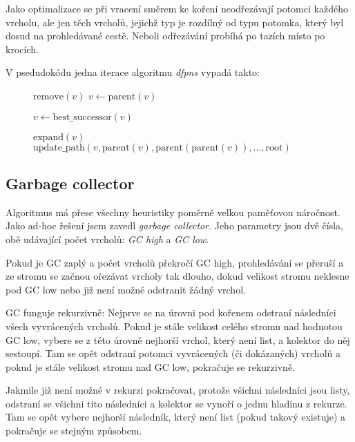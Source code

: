 \documentclass{article}
\begin{document}
Jako optimalizace se při vracení směrem ke kořeni neodřezávají potomci každého
vrcholu, ale jen těch vrcholů, jejichž typ je rozdílný od typu potomka, který
byl dosud na prohledávané cestě. Neboli odřezávání probíhá po tazích místo po
krocích.

V psedudokódu jedna iterace algoritmu \emph{dfpns} vypadá takto:
\begin{figure}[H]
\begin{algorithmic}
    \STATE {}
      \STATE \(\text{remove}(v)\)
    \ENDIF
    \STATE \(v \gets \text{parent}(v)\)
  \ENDWHILE
  
    \STATE \(v \gets \text{best\_successor}(v)\)
  \ENDWHILE
  
  \STATE \(\text{expand}(v)\)
  \STATE \(\text{update\_path}(v, \text{parent}(v), 
                               \text{parent}(\text{parent}(v)),
                               \ldots,
                               \text{root})\)
\end{algorithmic}
\end{figure}

\subsection{Garbage collector}
Algoritmus má přese všechny heuristiky poměrně velkou paměťovou náročnost. Jako
ad-hoc řešení jsem zavedl \emph{garbage collector}. Jeho parametry jsou dvě
čísla, obě udávající počet vrcholů: \emph{GC high} a \emph{GC low}.

Pokud je GC zaplý a počet vrcholů překročí GC high, prohledávání se
přeruší a ze stromu se začnou ořezávat vrcholy tak dlouho, dokud velikost
stromu neklesne pod GC low nebo již není možné odstranit žádný vrchol.

GC funguje rekurzivně: Nejprve se na úrovni pod kořenem odstraní následníci 
všech vyvrácených vrcholů. Pokud je stále velikost celého stromu nad hodnotou 
GC low, vybere se z této úrovně nejhorší vrchol, který není list, a kolektor do 
něj sestoupí. Tam se opět odstraní potomci vyvrácených (či dokázaných) vrcholů 
a pokud je stále velikost stromu nad GC low, pokračuje se rekurzivně.

Jakmile již není možné v rekurzi pokračovat, protože všichni následníci jsou
listy, odstraní se všichni tito následníci a kolektor se vynoří o jednu hladinu
z rekurze. Tam se opět vybere nejhorší následník, který není list (pokud takový
existuje) a pokračuje se stejným způsobem.
\end{document}
